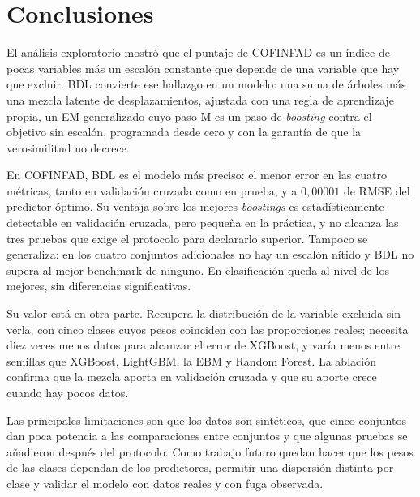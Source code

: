\section{Conclusiones}\label{sec:conclusiones}

El análisis exploratorio mostró que el puntaje de COFINFAD es un índice de pocas variables más un escalón constante que
depende de una variable que hay que excluir. BDL convierte ese hallazgo en un modelo: una suma de árboles más una
mezcla latente de desplazamientos, ajustada con una regla de aprendizaje propia, un EM generalizado cuyo paso M es un
paso de \emph{boosting} contra el objetivo sin escalón, programada desde cero y con la garantía de que la verosimilitud
no decrece.

En COFINFAD, BDL es el modelo más preciso: el menor error en las cuatro métricas, tanto en validación cruzada como en
prueba, y a $0{,}00001$ de RMSE del predictor óptimo. Su ventaja sobre los mejores \emph{boostings} es estadísticamente
detectable en validación cruzada, pero pequeña en la práctica, y no alcanza las tres pruebas que exige el protocolo
para declararlo superior. Tampoco se generaliza: en los cuatro conjuntos adicionales no hay un escalón nítido y BDL no
supera al mejor benchmark de ninguno. En clasificación queda al nivel de los mejores, sin diferencias significativas.

Su valor está en otra parte. Recupera la distribución de la variable excluida sin verla, con cinco clases cuyos pesos
coinciden con las proporciones reales; necesita diez veces menos datos para alcanzar el error de XGBoost, y varía
menos entre semillas que XGBoost, LightGBM, la EBM y Random Forest. La ablación confirma que la mezcla aporta en validación cruzada
y que su aporte crece cuando hay pocos datos.

Las principales limitaciones son que los datos son sintéticos, que cinco conjuntos dan poca potencia a las
comparaciones entre conjuntos y que algunas pruebas se añadieron después del protocolo. Como trabajo futuro quedan
hacer que los pesos de las clases dependan de los predictores, permitir una dispersión distinta por clase y validar el
modelo con datos reales y con fuga observada.
